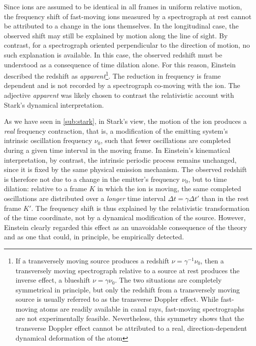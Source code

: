 \documentclass[submitted,12pt]{article}
\begin{document}
Since ions are assumed to be identical in all frames in uniform relative motion, the frequency shift of fast-moving ions measured by a spectrograph at rest cannot be attributed to a change in the ions themselves. In the longitudinal case, the observed shift may still be explained by motion along the line of sight. By contrast, for a spectrograph oriented perpendicular to the direction of motion, no such explanation is available. In this case, the observed redshift must be understood as a consequence of time dilation alone. For this reason, Einstein described the redshift as \emph{apparent}\footnote{If a transversely moving source produces a redshift $\nu=\gamma^{-1}\nu_0$, then a transversely moving spectrograph relative to a source at rest produces the inverse effect, a blueshift $\nu=\gamma\nu_0$. The two situations are completely symmetrical in principle, but only the redshift from a transversely moving source is usually referred to as the transverse Doppler effect. While fast-moving atoms are readily available in canal rays, fast-moving spectrographs are not experimentally feasible. Nevertheless, this symmetry shows that the transverse Doppler effect cannot be attributed to a real, direction-dependent dynamical deformation of the atom}. The reduction in frequency is frame dependent and is not recorded by a spectrograph co-moving with the ion. The adjective \emph{apparent} was likely chosen to contrast the relativistic account with Stark’s dynamical interpretation.

As we have seen in \cref{sub:stark}, in Stark’s view, the motion of the ion produces a \emph{real} frequency contraction, that is, a modification of the emitting system’s intrinsic oscillation frequency $\nu_0$, such that fewer oscillations are completed during a given time interval in the moving frame. In Einstein’s kinematical interpretation, by contrast, the intrinsic periodic process remains unchanged, since it is fixed by the same physical emission mechanism. The observed redshift is therefore not due to a change in the emitter’s frequency $\nu_0$, but to time dilation: relative to a frame $K$ in which the ion is moving, the same completed oscillations are distributed over a \emph{longer} time interval $\Delta t=\gamma\Delta t'$ than in the rest frame $K'$. The frequency shift is thus explained by the relativistic transformation of the time coordinate, not by a dynamical modification of the source. However, Einstein clearly regarded this  effect as an unavoidable consequence of the theory and as one that could, in principle, be empirically detected. 
\end{document}
